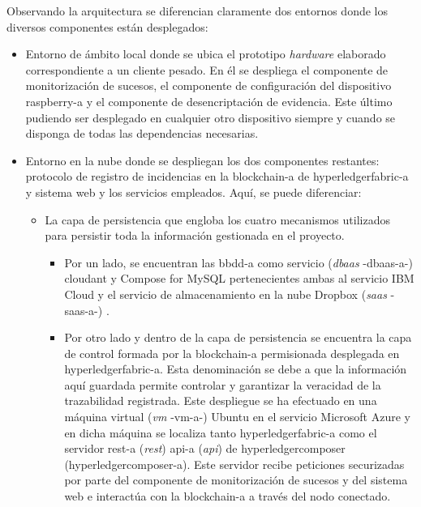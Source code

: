 \documentclass[12pt,a4paper, twoside]{report}
\begin{document}
	Observando la arquitectura se diferencian claramente dos entornos donde los diversos componentes están desplegados:

	\begin{itemize}
		\item Entorno de ámbito local donde se ubica el \gls{prototipo} \textit{hardware} elaborado correspondiente a un cliente pesado. En él se despliega el componente de monitorización de sucesos, el componente de configuración del dispositivo \gls{raspberry-a} y el componente de desencriptación de evidencia. Este último pudiendo ser desplegado en cualquier otro dispositivo siempre y cuando se disponga de todas las dependencias necesarias.
	
		\item Entorno en la nube donde se despliegan los dos componentes restantes: protocolo de registro de incidencias en la \gls{blockchain-a} de \gls{hyperledgerfabric-a} y sistema web y los servicios empleados. Aquí, se puede diferenciar:

		\begin{itemize}
			\item La capa de persistencia que engloba los cuatro mecanismos utilizados para persistir toda la información gestionada en el proyecto.
						
			\begin{itemize}
				\item Por un lado, se encuentran las \gls{bbdd-a} como servicio (\textit{\gls{dbaas}} -\gls{dbaas-a}-) \gls{cloudant} y Compose for MySQL pertenecientes ambas al servicio IBM Cloud y el servicio de almacenamiento en la nube Dropbox (\textit{\gls{saas}} -\gls{saas-a}-) \cite{gonzalez:2011:TCCS}.
			
				\item Por otro lado y dentro de la capa de persistencia se encuentra la capa de control formada por la \gls{blockchain-a} permisionada desplegada en \gls{hyperledgerfabric-a}. Esta denominación se debe a que la información aquí guardada permite controlar y garantizar la veracidad de la trazabilidad registrada. Este despliegue se ha efectuado en una máquina virtual (\textit{\gls{vm}} -\gls{vm-a}-) Ubuntu en el servicio Microsoft Azure y en dicha máquina se localiza tanto \gls{hyperledgerfabric-a} como el servidor \gls{rest-a} (\textit{\gls{rest}}) \gls{api-a} (\textit{\gls{api}}) de \gls{hyperledgercomposer} (\gls{hyperledgercomposer-a}). Este servidor recibe peticiones securizadas por parte del componente de monitorización de sucesos y del sistema web e interactúa con la \gls{blockchain-a} a través del nodo conectado.								
			\end{itemize}  
		 				 		

\end{itemize}
\end{itemize}
\end{document}
